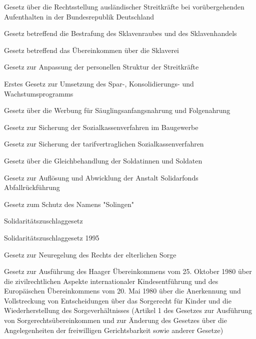 \item[{SkAufG}] Gesetz über die Rechtsstellung ausländischer Streitkräfte bei vorübergehenden Aufenthalten in der Bundesrepublik Deutschland

\item[{SklHG}] Gesetz betreffend die Bestrafung des Sklavenraubes und des Sklavenhandels

\item[{SklÜbkG}] Gesetz betreffend das Übereinkommen über die Sklaverei

\item[{SKPersStruktAnpG}] Gesetz zur Anpassung der personellen Struktur der Streitkräfte

\item[{SKWPG-1}] Erstes Gesetz zur Umsetzung des Spar-, Konsolidierungs- und Wachstumsprogramms

\item[{SNWG}] Gesetz über die Werbung für Säuglingsanfangsnahrung und Folgenahrung

\item[{SokaSiG}] Gesetz zur Sicherung der Sozialkassenverfahren im Baugewerbe

\item[{SokaSiG-2}] Gesetz zur Sicherung der tarifvertraglichen Sozialkassenverfahren

\item[{SoldGG}] Gesetz über die Gleichbehandlung der Soldatinnen und Soldaten

\item[{SolidarfAbfAuflG}] Gesetz zur Auflösung und Abwicklung der Anstalt Solidarfonds Abfallrückführung

\item[{SolingenG}] Gesetz zum Schutz des Namens "Solingen"

\item[{SolZG}] Solidaritätszuschlaggesetz

\item[{SolZG-1995}] Solidaritätszuschlaggesetz 1995

\item[{SorgeRNG}] Gesetz zur Neuregelung des Rechts der elterlichen Sorge

\item[{SorgeRÜbkAG}] Gesetz zur Ausführung des Haager Übereinkommens vom 25. Oktober 1980 über die zivilrechtlichen Aspekte internationaler Kindesentführung und des Europäischen Übereinkommens vom 20. Mai 1980 über die Anerkennung und Vollstreckung von Entscheidungen über das Sorgerecht für Kinder und die Wiederherstellung des Sorgeverhältnisses (Artikel 1 des Gesetzes zur Ausführung von Sorgerechtsübereinkommen und zur Änderung des Gesetzes über die Angelegenheiten der freiwilligen Gerichtsbarkeit sowie anderer Gesetze)


